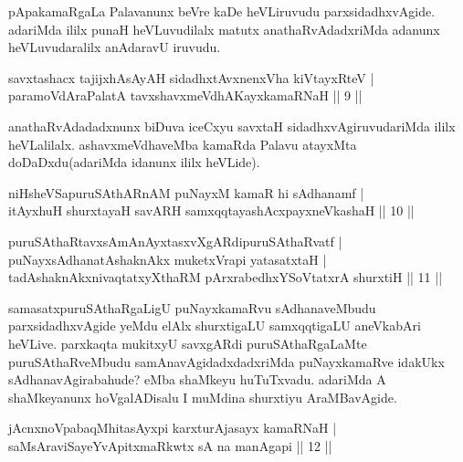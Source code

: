 \begin{artha}
pApakamaRgaLa Palavanunx beVre kaDe heVLiruvudu parxsidadhxvAgide. adariMda ililx punaH heVLuvudilalx matutx anathaRvAdadxriMda adanunx heVLuvudaralilx anAdaravU iruvudu.
\end{artha}

\begin{shl}
savxtashacx tajijxhAsAyAH sidadhxtAvxnenxVha kiVtayxRteV |\\
paramoVdAraPalatA tavxshavxmeVdhAKayxkamaRNaH \hfill || 9 ||
\end{shl}

\begin{artha}
anathaRvAdadadxnunx biDuva iceCxyu savxtaH sidadhxvAgiruvudariMda ililx heVLalilalx. ashavxmeVdhaveMba kamaRda Palavu atayxMta doDaDxdu(adariMda idanunx ililx heVLide).
\end{artha}


\begin{shl}
niHsheVSapuruSAthARnAM puNayxM kamaR hi sAdhanamf |\\
itAyxhuH shurxtayaH savARH samxqqtayashAcxpayxneVkashaH \hfill || 10 ||
\end{shl}

\begin{shl}
puruSAthaRtavxsAmAnAyxtasxvXgARdipuruSAthaRvatf |\\
puNayxsAdhanatAshaknAkx muketxVrapi yatasatxtaH |\\
tadAshaknAkxnivaqtatxyXthaRM pArxrabedhxYSoVtatxrA shurxtiH \hfill || 11 ||
\end{shl}

\begin{artha}
samasatxpuruSAthaRgaLigU puNayxkamaRvu sAdhanaveMbudu parxsidadhxvAgide yeMdu elAlx shurxtigaLU samxqqtigaLU aneVkabAri heVLive. parxkaqta mukitxyU savxgARdi puruSAthaRgaLaMte puruSAthaRveMbudu samAnavAgidadxdadxriMda puNayxkamaRve idakUkx sAdhanavAgirabahude? eMba shaMkeyu huTuTxvadu. adariMda A shaMkeyanunx hoVgalADisalu I muMdina shurxtiyu AraMBavAgide.
\end{artha}


\begin{shl}
jAcnxnoVpabaqMhitasAyxpi karxturAjasayx kamaRNaH |\\
saMsAraviSayeYvA\s \s pitxmaRkwtx sA na manAgapi \hfill || 12 ||
\end{shl}

